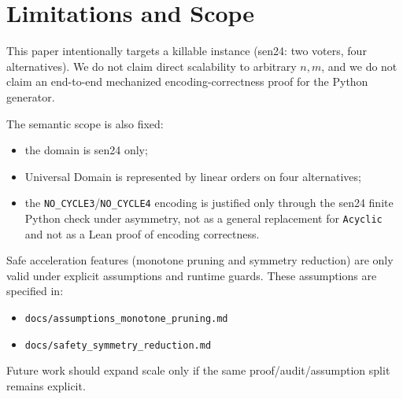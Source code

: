 \section{Limitations and Scope}

This paper intentionally targets a killable instance (sen24: two voters, four alternatives).
We do not claim direct scalability to arbitrary $n,m$, and we do not claim an end-to-end mechanized encoding-correctness proof for the Python generator.

The semantic scope is also fixed:
\begin{itemize}[leftmargin=*]
  \item the domain is sen24 only;
  \item Universal Domain is represented by linear orders on four alternatives;
  \item the \texttt{NO\_CYCLE3}/\texttt{NO\_CYCLE4} encoding is justified only through the sen24 finite Python check under asymmetry, not as a general replacement for \texttt{Acyclic} and not as a Lean proof of encoding correctness.
\end{itemize}

Safe acceleration features (monotone pruning and symmetry reduction) are only valid under explicit assumptions and runtime guards.
These assumptions are specified in:
\begin{itemize}[leftmargin=*]
  \item \texttt{docs/assumptions\_monotone\_pruning.md}
  \item \texttt{docs/safety\_symmetry\_reduction.md}
\end{itemize}

Future work should expand scale only if the same proof/audit/assumption split remains explicit.

